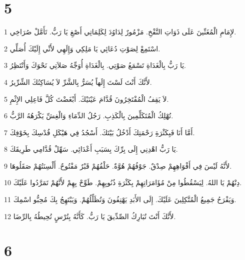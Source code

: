 \chapter{5}

\par 1 لإِمَامِ الْمُغَنِّينَ عَلَى ذَوَاتِ النَّفْخِ. مَزْمُورٌ لِدَاوُدَ لِكَلِمَاتِي أَصْغِ يَا رَبُّ. تَأَمَّلْ صُرَاخِي.
\par 2 اسْتَمِعْ لِصَوْتِ دُعَائِي يَا مَلِكِي وَإِلَهِي لأَنِّي إِلَيْكَ أُصَلِّي.
\par 3 يَا رَبُّ بِالْغَدَاةِ تَسْمَعُ صَوْتِي. بِالْغَدَاةِ أُوَجِّهُ صَلاَتِي نَحْوَكَ وَأَنْتَظِرُ.
\par 4 لأَنَّكَ أَنْتَ لَسْتَ إِلَهاً يُسَرُّ بِالشَّرِّ لاَ يُسَاكِنُكَ الشِّرِّيرُ.
\par 5 لاَ يَقِفُ الْمُفْتَخِرُونَ قُدَّامَ عَيْنَيْكَ. أَبْغَضْتَ كُلَّ فَاعِلِي الإِثْمِ.
\par 6 تُهْلِكُ الْمُتَكَلِّمِينَ بِالْكَذِبِ. رَجُلُ الدِّمَاءِ وَالْغِشِّ يَكْرَهُهُ الرَّبُّ.
\par 7 أَمَّا أَنَا فَبِكَثْرَةِ رَحْمَتِكَ أَدْخُلُ بَيْتَكَ. أَسْجُدُ فِي هَيْكَلِ قُدْسِكَ بِخَوْفِكَ.
\par 8 يَا رَبُّ اهْدِنِي إِلَى بِرِّكَ بِسَبَبِ أَعْدَائِي. سَهِّلْ قُدَّامِي طَرِيقَكَ.
\par 9 لأَنَّهُ لَيْسَ فِي أَفْوَاهِهِمْ صِدْقٌ. جَوْفُهُمْ هُوَّةٌ. حَلْقُهُمْ قَبْرٌ مَفْتُوحٌ. أَلْسِنَتُهُمْ صَقَلُوهَا.
\par 10 دِنْهُمْ يَا اللهُ. لِيَسْقُطُوا مِنْ مُؤَامَرَاتِهِمْ بِكَثْرَةِ ذُنُوبِهِمْ. طَوِّحْ بِهِمْ لأَنَّهُمْ تَمَرَّدُوا عَلَيْكَ.
\par 11 وَيَفْرَحُ جَمِيعُ الْمُتَّكِلِينَ عَلَيْكَ. إِلَى الأَبَدِ يَهْتِفُونَ وَتُظَلِّلُهُمْ. وَيَبْتَهِجُ بِكَ مُحِبُّو اسْمِكَ.
\par 12 لأَنَّكَ أَنْتَ تُبَارِكُ الصِّدِّيقَ يَا رَبُّ. كَأَنَّهُ بِتُرْسٍ تُحِيطُهُ بِالرِّضَا.

\chapter{6}

